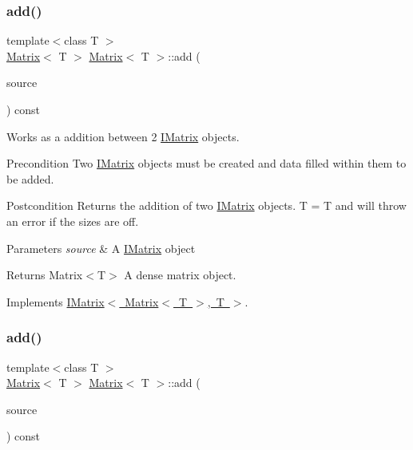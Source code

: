 \subsubsection{\texorpdfstring{add()}{add()}\hspace{0.1cm}{\footnotesize\ttfamily [1/6]}}
{\footnotesize\ttfamily template$<$class T $>$ \\
\mbox{\hyperlink{class_matrix}{Matrix}}$<$ T $>$ \mbox{\hyperlink{class_matrix}{Matrix}}$<$ T $>$\+::add (\begin{DoxyParamCaption}\item[{const \mbox{\hyperlink{class_i_matrix}{I\+Matrix}}$<$ \mbox{\hyperlink{class_matrix}{Matrix}}$<$ T $>$, T $>$ \&}]{source }\end{DoxyParamCaption}) const\hspace{0.3cm}{\ttfamily [virtual]}}



Works as a addition between 2 \mbox{\hyperlink{class_i_matrix}{I\+Matrix}} objects. 

\begin{DoxyPrecond}{Precondition}
Two \mbox{\hyperlink{class_i_matrix}{I\+Matrix}} objects must be created and data filled within them to be added. 
\end{DoxyPrecond}
\begin{DoxyPostcond}{Postcondition}
Returns the addition of two \mbox{\hyperlink{class_i_matrix}{I\+Matrix}} objects. T = T and will throw an error if the sizes are off.
\end{DoxyPostcond}

\begin{DoxyParams}{Parameters}
{\em source} & A \mbox{\hyperlink{class_i_matrix}{I\+Matrix}} object \\
\hline
\end{DoxyParams}
\begin{DoxyReturn}{Returns}
Matrix$<$\+T$>$ A dense matrix object. 
\end{DoxyReturn}


Implements \mbox{\hyperlink{class_i_matrix_a661dc43bb607b98c28414cdd49bc64f7}{I\+Matrix$<$ Matrix$<$ T $>$, T $>$}}.

\mbox{\label{class_matrix_aab90764c401b55d9a80fc20c50593041}} 
\subsubsection{\texorpdfstring{add()}{add()}\hspace{0.1cm}{\footnotesize\ttfamily [2/6]}}
{\footnotesize\ttfamily template$<$class T $>$ \\
\mbox{\hyperlink{class_matrix}{Matrix}}$<$ T $>$ \mbox{\hyperlink{class_matrix}{Matrix}}$<$ T $>$\+::add (\begin{DoxyParamCaption}\item[{const \mbox{\hyperlink{class_i_matrix}{I\+Matrix}}$<$ \mbox{\hyperlink{class_t_matrix}{T\+Matrix}}$<$ T $>$, T $>$ \&}]{source }\end{DoxyParamCaption}) const}



